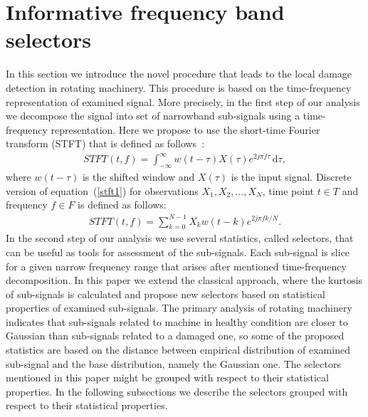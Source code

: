 \documentclass[3p,times]{elsarticle}
\begin{document}
\section{Informative frequency band selectors}\label{selectors}
In this section we introduce the novel procedure that leads to the local damage detection in rotating machinery. This procedure is based on the time-frequency representation of examined signal. More precisely, in the first step of our analysis we decompose the signal into set of narrowband sub-signals using a time-frequency representation. Here we propose to use the short-time Fourier transform (STFT) that  is defined as follows~\cite{allen}:
\begin{eqnarray}\label{stft1}
STFT(t,f)=\int_{-\infty}^{\infty}{w(t-\tau)X(\tau)e^{2j\pi f\tau}}\, \mathrm{d} \tau,
\label{stft-cont}\end{eqnarray}
where $w(t-\tau)$ is the shifted window and $X(\tau)$ is the input signal. Discrete version of equation~(\ref{stft1}) for observations $X_1,X_2,...,X_N$, time point $t\in T$ and frequency $f\in \textit{F} $ is defined as follows:
\begin{eqnarray}
STFT(t,f)=\sum_{k=0}^{N-1}X_k w(t-k)e^{2j\pi f k/N}.
\label{stft-discr}\end{eqnarray}
In the second step of our analysis we use several statistics, called selectors, that can be useful as tools for assessment of the sub-signals. Each sub-signal is slice for a given narrow frequency range that arises after mentioned time-frequency decomposition. In this paper we extend the classical approach, where the kurtosis of sub-signals is calculated and propose new selectors based on statistical properties of examined sub-signals. The primary analysis of rotating machinery indicates that sub-signals related to machine in healthy condition are closer to Gaussian than sub-signals related to a damaged one, so some of the proposed statistics are based on the distance between empirical distribution of examined sub-signal and the base distribution, namely the Gaussian one. The selectors mentioned in this paper might be grouped with respect to their statistical properties. In the following subsections we describe the selectors grouped with respect to their statistical properties.
\end{document}
